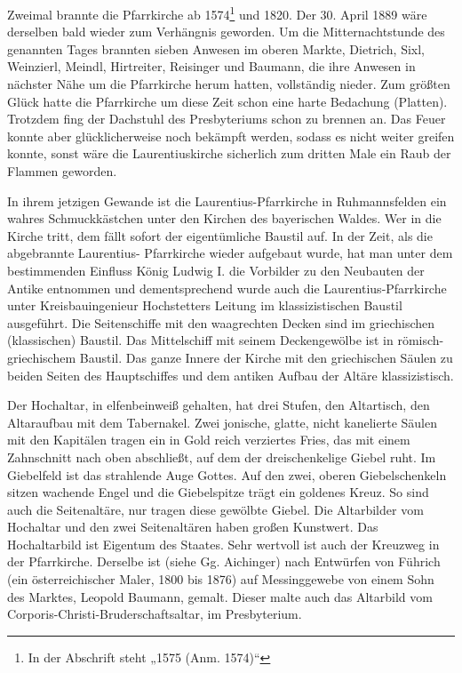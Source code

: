 \documentclass[12pt,a4paper]{book}
\begin{document}
Zweimal brannte die Pfarrkirche ab 1574\footnote{In der Abschrift steht
„1575 (Anm. 1574)“} und 1820. Der 30. April 1889 wäre derselben bald
wieder zum Verhängnis geworden. Um die Mitternachtstunde des genannten
Tages brannten sieben Anwesen im oberen Markte, Dietrich, Sixl,
Weinzierl, Meindl, Hirtreiter, Reisinger und Baumann, die ihre Anwesen
in nächster Nähe um die Pfarrkirche herum hatten, vollständig nieder.
Zum größten Glück hatte die Pfarrkirche um diese Zeit schon eine harte
Bedachung (Platten). Trotzdem fing der Dachstuhl des Presbyteriums schon
zu brennen an. Das Feuer konnte aber glücklicherweise noch bekämpft
werden, sodass es nicht weiter greifen konnte, sonst wäre die
Laurentiuskirche sicherlich zum dritten Male ein Raub der Flammen
geworden.

In ihrem jetzigen Gewande ist die Laurentius-Pfarrkirche in
Ruhmannsfelden ein wahres Schmuckkästchen unter den Kirchen des
bayerischen Waldes. Wer in die Kirche tritt, dem fällt sofort der
eigentümliche Baustil auf. In der Zeit, als die abgebrannte Laurentius-
Pfarrkirche wieder aufgebaut wurde, hat man unter dem bestimmenden
Einfluss König Ludwig I. die Vorbilder zu den Neubauten der Antike
entnommen und dementsprechend wurde auch die Laurentius-Pfarrkirche
unter Kreisbauingenieur Hochstetters Leitung im klassizistischen Baustil
ausgeführt. Die Seitenschiffe mit den waagrechten Decken sind im
griechischen (klassischen) Baustil. Das Mittelschiff mit seinem
Deckengewölbe ist in römisch-griechischem Baustil. Das ganze Innere der
Kirche mit den griechischen Säulen zu beiden Seiten des Hauptschiffes
und dem antiken Aufbau der Altäre klassizistisch.

Der Hochaltar, in elfenbeinweiß gehalten, hat drei Stufen, den
Altartisch, den Altaraufbau mit dem Tabernakel. Zwei jonische, glatte,
nicht kanelierte Säulen mit den Kapitälen tragen ein in Gold reich
verziertes Fries, das mit einem Zahnschnitt nach oben abschließt, auf
dem der dreischenkelige Giebel ruht. Im Giebelfeld ist das strahlende
Auge Gottes. Auf den zwei, oberen Giebelschenkeln sitzen wachende Engel
und die Giebelspitze trägt ein goldenes Kreuz. So sind auch die
Seitenaltäre, nur tragen diese gewölbte Giebel. Die Altarbilder vom
Hochaltar und den zwei Seitenaltären haben großen Kunstwert. Das
Hochaltarbild ist Eigentum des Staates. Sehr wertvoll ist auch der
Kreuzweg in der Pfarrkirche. Derselbe ist (siehe Gg. Aichinger) nach
Entwürfen von Führich (ein österreichischer Maler, 1800 bis 1876) auf
Messinggewebe von einem Sohn des Marktes, Leopold Baumann, gemalt.
Dieser malte auch das Altarbild vom Corporis-Christi-Bruderschaftsaltar,
im Presbyterium.
\end{document}
